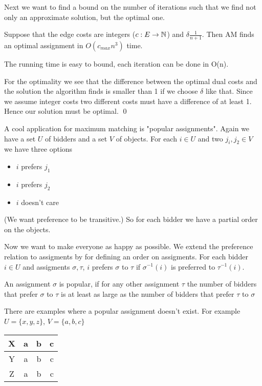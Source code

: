 Next we want to find a bound on the number of iterations such that we find not only an approximate solution, but the optimal one.

\begin{thm} Suppose that the edge costs are integers ($c:E\rightarrow \mathbb{N}$) and $\delta \frac{1}{n+1}$. Then AM finds an optimal assignment in $O(c_{max}n^3)$ time.
\end{thm}

\begin{pr} The running time is easy to bound, each iteration can be done in O(n).

For the optimality we see that the difference between the optimal dual costs and the solution the algorithm finds is smaller than 1 if we choose $\delta$ like that. Since we assume integer costs two different costs must have a difference of at least 1. Hence our solution must be optimal.
\qed \end{pr}

A cool application for maximum matching is "popular assignments". Again we have a set $U$ of bidders and a set $V$ of objects. For each $i\in U$ and two $j_i,j_2\in V$ we have three options

\begin{itemize}
\item $i$ prefers $j_1$
\item $i$ prefers $j_2$
\item $i$ doesn't care
\end{itemize}

(We want preference to be transitive.) So for each bidder we have a partial order on the objects.

Now we want to make everyone as happy as possible. We extend the preference relation to assigments by for defining an order on assigments. For each bidder $i\in U$ and assigments $\sigma,\tau$, $i$ prefers $\sigma$ to $\tau$ if $\sigma^{-1}(i)$ is preferred to $\tau^{-1}(i)$.

\begin{Def} An assignment $\sigma$ is popular, if for any other assignment $\tau$ the number of bidders that prefer $\sigma$ to $\tau$ is at least as large as the number of bidders that prefer $\tau$ to $\sigma$
\end{Def}

There are examples where a popular assignment doesn't exist. For example $U=\{x,y,z\}$, $V = \{a,b,c\}$

\begin{center}
\begin{tabular}{c|ccc}
X & \cellcolor{gruen} a & b & \cellcolor{rot}c\\\hline
Y & a & \cellcolor{rot}b & \cellcolor{gruen}c\\\hline
Z & \cellcolor{rot}a & \cellcolor{gruen}b & c\\
\end{tabular}
\end{center}

